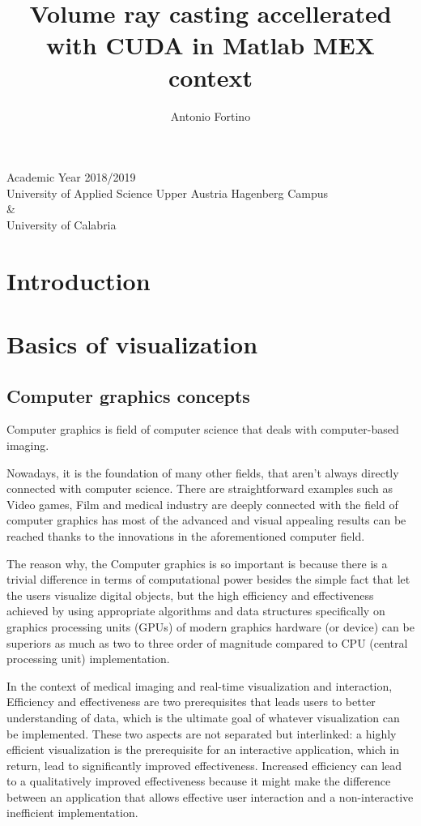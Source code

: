 \documentclass[12pt,a4paper]{extarticle}
\author{Antonio Fortino}
\title{Volume ray casting accellerated with CUDA in Matlab MEX context}
\newcommand{\linespace}{\vspace{8pt}}
\begin{document}
\maketitle
\begin{center}
Academic Year 2018/2019\\
University of Applied Science Upper Austria Hagenberg Campus\\
\&\\
University of Calabria
\end{center}
\pagebreak
{}
\fancyhf{}
\fancyhead[R]{\thepage}
\tableofcontents
\pagebreak
{}
\section*{Introduction} 
\pagebreak
\fancyhead[L]{\nouppercase{\leftmark}}
\section{Basics of visualization}
\subsection{Computer graphics concepts} 
Computer graphics is field of computer science that deals with computer-based imaging.

Nowadays, it is the foundation of many other fields, that aren't always directly connected with computer science. There are straightforward examples such as Video games, Film and medical industry are deeply connected with the field of computer graphics has most of the advanced and visual appealing results can be reached thanks to the innovations in the aforementioned computer field.

The reason why, the Computer graphics is so important is because there is a trivial difference in terms of computational power besides the simple fact that let the users visualize digital objects, but the high efficiency and effectiveness achieved by using appropriate algorithms and data structures specifically on graphics processing units (GPUs) of modern graphics hardware (or device) can be superiors as much as two to three order of magnitude compared to CPU (central processing unit) implementation.
\linespace

In the context of medical imaging and real-time visualization and interaction, Efficiency and effectiveness are two prerequisites that leads users to better understanding of data, which is the ultimate goal of whatever visualization can be implemented.
These two aspects are not separated but interlinked: a highly efficient visualization is the prerequisite for an interactive application, which in return, lead to significantly improved effectiveness.
\cite{weiskopf_2006:1} %
Increased efficiency can lead to a qualitatively improved effectiveness because it might make the difference between an application that allows effective user interaction and a non-interactive inefficient implementation.
\linespace
\end{document}
